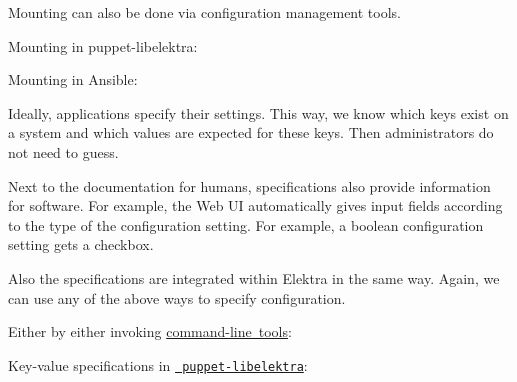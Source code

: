 Mounting can also be done via configuration management tools.

Mounting in puppet-\/libelektra\+:


\begin{DoxyCode}{0}
\DoxyCodeLine{\}}
\DoxyCodeLine{\}}
\end{DoxyCode}


Mounting in Ansible\+:


\begin{DoxyCode}{0}
\end{DoxyCode}


Ideally, applications specify their settings. This way, we know which keys exist on a system and which values are expected for these keys. Then administrators do not need to guess.

Next to the documentation for humans, specifications also provide information for software. For example, the Web UI automatically gives input fields according to the type of the configuration setting. For example, a boolean configuration setting gets a checkbox.

Also the specifications are integrated within Elektra in the same way. Again, we can use any of the above ways to specify configuration.

Either by either invoking \mbox{\hyperlink{doc_help_kdb_md}{command-\/line tools}}\+:


\begin{DoxyCode}{0}
\end{DoxyCode}


Key-\/value specifications in \href{https://puppet.libelektra.org}{\texttt{ puppet-\/libelektra}}\+:



